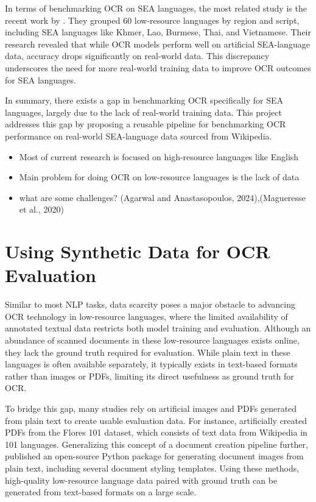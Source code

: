 \documentclass[12pt,oneside]{memoir}
\begin{document}
In terms of benchmarking OCR on SEA languages, the most related study is the recent work by \textcite{ignat-etal-2022}.
They grouped 60 low-resource languages by region and script, including SEA languages like Khmer, Lao, Burmese, Thai, and Vietnamese.
Their research revealed that while OCR models perform well on artificial SEA-language data, accuracy drops significantly on real-world data.
This discrepancy underscores the need for more real-world training data to improve OCR outcomes for SEA languages.

In summary, there exists a gap in benchmarking OCR specifically for SEA languages, largely due to the lack of real-world training data.
This project addresses this gap by proposing a reusable pipeline for benchmarking OCR performance on real-world SEA-language data sourced from Wikipedia.

\begin{itemize}
    \item Most of current research is focused on high-resource languages like English
    \item Main problem for doing OCR on low-resource languages is the lack of data
    \item what are some challenges? (Agarwal and Anastasopoulos, 2024),(Magueresse et al., 2020)
\end{itemize}

\section{Using Synthetic Data for OCR Evaluation}

Similar to most NLP tasks, data scarcity poses a major obstacle to advancing OCR technology in low-resource languages, where the limited availability of annotated textual data restricts both model training and evaluation.
Although an abundance of scanned documents in these low-resource languages exists online, they lack the ground truth required for evaluation.
While plain text in these languages is often available separately, it typically exists in text-based formats rather than images or PDFs, limiting its direct usefulness as ground truth for OCR.

To bridge this gap, many studies rely on artificial images and PDFs generated from plain text to create usable evaluation data.
For instance, \textcite{ignat-etal-2022} artificially created PDFs from the Flores 101 dataset, which consists of text data from Wikipedia in 101 languages.
Generalizing this concept of a document creation pipeline further, \textcite{gupte-etal-2021} published an open-source Python package for generating document images from plain text, including several document styling templates.
Using these methods, high-quality low-resource language data paired with ground truth can be generated from text-based formats on a large scale.
\end{document}
